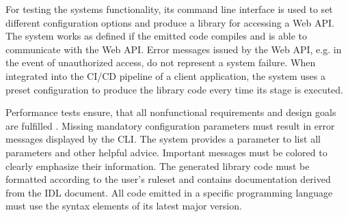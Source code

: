 For testing the systems functionality, its command line interface is used to set different configuration options and produce a library for accessing a Web API. The system works as defined if the emitted code compiles and is able to communicate with the Web API. Error messages issued by the Web API, e.g. in the event of unauthorized access, do not represent a system failure. When integrated into the CI/CD pipeline of a client application, the system uses a preset configuration to produce the library code every time its stage is executed.

Performance tests ensure, that all nonfunctional requirements and design goals are fulfilled \cite{bruegge_object-oriented_2010}. Missing mandatory configuration parameters must result in error messages displayed by the \ac{CLI}. The system provides a parameter to list all parameters and other helpful advice. Important messages must be colored to clearly emphasize their information. The generated library code must be formatted according to the user's ruleset and contains documentation derived from the \ac{IDL} document. All code emitted in a specific programming language must use the syntax elements of its latest major version.